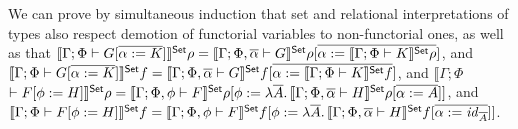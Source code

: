 \documentclass[runningheads]{llncs}
\newcommand{\set}{\mathsf{Set}}
\renewcommand{\id}{\mathit{id}}
\renewcommand{\id}{\mathit{id}}
\begin{document}
We can prove by simultaneous induction that set and relational
interpretations of types also respect demotion of functorial variables to
non-functorial ones, as well as that
$\setsem{\Gamma;\Phi \vdash G[\ol{\alpha := K}]}\rho =
\setsem{\Gamma;\Phi,\ol{\alpha} \vdash G}\rho[\ol{\alpha := 
\setsem{\Gamma;\Phi \vdash K}\rho}]$, and
$\setsem{\Gamma;\Phi \vdash G[\ol{\alpha := K}]}f =
\setsem{\Gamma;\Phi,\ol{\alpha} \vdash G}f[\ol{\alpha :=
\setsem{\Gamma;\Phi \vdash K}f}]$, and
$\llbracket \Gamma; \Phi$
$\vdash F[\phi := H] \rrbracket^\set \rho
= \setsem{\Gamma; \Phi, \phi \vdash F}\rho
[\phi := \lambda \ol{A}.\, \setsem{\Gamma;\Phi,\overline{\alpha}\vdash
    H}\rho[\overline{\alpha := A}]]$, and 
$\setsem{\Gamma; \Phi \vdash F[\phi := H]}f
= \setsem{\Gamma; \Phi, \phi \vdash F}f
[\phi := \lambda \ol{A}.\,\setsem{\Gamma;\Phi,\overline{\alpha}\vdash
    H}f[\overline{\alpha := \id_{\ol{A}}}]]$. 
\end{document}
